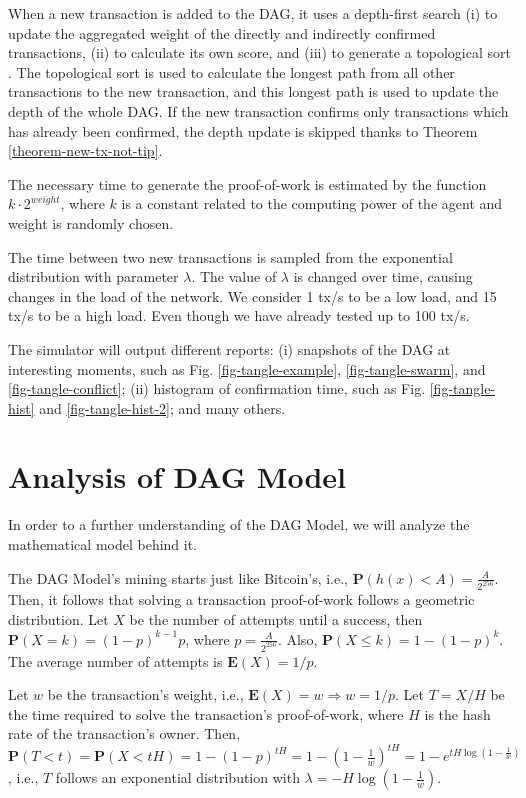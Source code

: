 When a new transaction is added to the DAG, it uses a depth-first search \citep{cormen2009introduction} (i) to update the aggregated weight of the directly and indirectly confirmed transactions, (ii) to calculate its own score, and (iii) to generate a topological sort \citep{cormen2009introduction}. The topological sort is used to calculate the longest path from all other transactions to the new transaction, and this longest path is used to update the depth of the whole DAG. If the new transaction confirms only transactions which has already been confirmed, the depth update is skipped thanks to Theorem \ref{theorem-new-tx-not-tip}.

The necessary time to generate the proof-of-work is estimated by the function $k \cdot 2^{weight}$, where $k$ is a constant related to the computing power of the agent and weight is randomly chosen.

The time between two new transactions is sampled from the exponential distribution with parameter $\lambda$. The value of $\lambda$ is changed over time, causing changes in the load of the network. We consider 1 tx/s to be a low load, and 15 tx/s to be a high load. Even though we have already tested up to 100 tx/s.

The simulator will output different reports: (i) snapshots of the DAG at interesting moments, such as Fig. \ref{fig-tangle-example}, \ref{fig-tangle-swarm}, and \ref{fig-tangle-conflict}; (ii) histogram of confirmation time, such as Fig. \ref{fig-tangle-hist} and \ref{fig-tangle-hist-2}; and many others.

\chapter{Analysis of DAG Model}

In order to a further understanding of the DAG Model, we will analyze the mathematical model behind it.

The DAG Model's mining starts just like Bitcoin's, i.e., $\mathbf{P}(h(x) < A) = \frac{A}{2^{256}}$. Then, it follows that solving a transaction proof-of-work follows a geometric distribution. Let $X$ be the number of attempts until a success, then $\mathbf{P}(X=k) = (1-p)^{k-1}p$, where $p=\frac{A}{2^{256}}$. Also, $\mathbf{P}(X \leq k)=1-(1-p)^k$. The average number of attempts is $\mathbf{E}(X)=1/p$.

Let $w$ be the transaction's weight, i.e., $\mathbf{E}(X)=w \Rightarrow w = 1/p$. Let $T = X/H$ be the time required to solve the transaction's proof-of-work, where $H$ is the hash rate of the transaction's owner. Then, $\mathbf{P}(T < t) = \mathbf{P}(X < tH) = 1 - (1 - p)^{tH} = 1 - \left( 1 - \frac{1}{w} \right)^{tH} = 1 - e^{tH \log\left(1 - \frac{1}{w} \right)}$, i.e., $T$ follows an exponential distribution with $\lambda = -H \log\left(1 - \frac{1}{w} \right)$.

